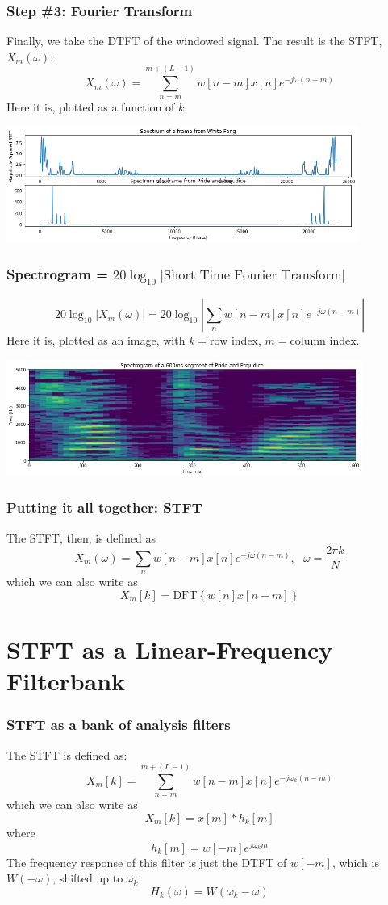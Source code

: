 \documentclass{beamer}
\begin{document}
\begin{frame}
  \frametitle{Step \#3: Fourier Transform}

  Finally, we take the DTFT of the windowed signal.  The result is the
  STFT, $X_m(\omega)$:
  \[
  X_m(\omega) = \sum_{n=m}^{m+(L-1)} w[n-m]x[n]e^{-j\omega (n-m)} 
  \]
  Here it is, plotted as a function of $k$:
  \centerline{\includegraphics[height=1.5in]{librivox_dftsquared.png}}
\end{frame}

\begin{frame}
  \frametitle{Spectrogram = $20\log_{10}|\mbox{Short Time Fourier Transform}|$}

  \[
  20\log_{10}|X_m(\omega)| = 20\log_{10}\left|\sum_{n}w[n-m]x[n]e^{-j\omega (n-m)}\right|
  \]
  Here it is, plotted as an image, with $k=$row index, $m=$column index.
  \centerline{\includegraphics[height=1.5in]{librivox_spectrograms.png}}
\end{frame}

\begin{frame}
  \frametitle{Putting it all together: STFT}
  The STFT, then, is defined as
  \[
  X_m(\omega)= \sum_{n} w[n-m]x[n]e^{-j\omega (n-m)},~~~\omega=\frac{2\pi k}{N}
  \]
  which we can also write as
  \[
  X_m[k] = \mbox{DFT}\left\{w[n]x[n+m]\right\}
  \]
\end{frame}

\section[Linear Frequency]{STFT as a Linear-Frequency Filterbank}
\setcounter{subsection}{1}

\begin{frame}
  \frametitle{STFT as a bank of analysis filters}

  The STFT is defined as:
  \[
  X_m[k] = \sum_{n=m}^{m+(L-1)} w[n-m]x[n]e^{-j\omega_k(n-m)}
  \]
  which we can also write as
  \[
  X_m[k] = x[m] \ast h_k[m]
  \]
  where
  \[
  h_k[m] = w[-m]e^{j\omega_k m}
  \]
  The frequency response of this filter is just the DTFT of $w[-m]$,
  which is $W(-\omega)$, shifted up to $\omega_k$:
  \[
  H_k(\omega) = W\left(\omega_k-\omega\right)
  \]
\end{frame}
\end{document}
